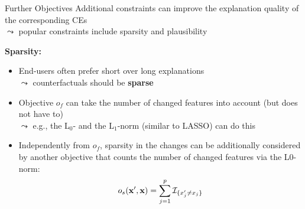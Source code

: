 \documentclass[11pt,compress,t,notes=noshow, aspectratio=169, xcolor=table, usenames,dvipsnames]{beamer}
\begin{document}
\begin{frame}{Further Objectives}
	Additional constraints can improve the explanation quality of the corresponding CEs\\
	$\leadsto$ popular constraints include sparsity and plausibility
	
	\lz

	\textbf{Sparsity:}
	\begin{itemize}[<+->]
		\item End-users often prefer short over long explanations\\
		$\leadsto$ %
		counterfactuals should be \textbf{sparse} %
		\item Objective $o_f$ can take the number of changed features into account (but does not have to)\\
		$\leadsto$ e.g., the L$_0$- and the L$_1$-norm (similar to LASSO) can do this
        \item Independently from $o_f$, sparsity in the changes can be additionally considered by another objective that counts the number of changed features via the L0-norm:
        $$o_s(\mathbf{x}', \mathbf{x}) = \sum_{j = 1}^p {\mathcal{I}}_{\{ x'_j \neq x_j \}}$$
	\end{itemize}
\end{frame}
\end{document}
